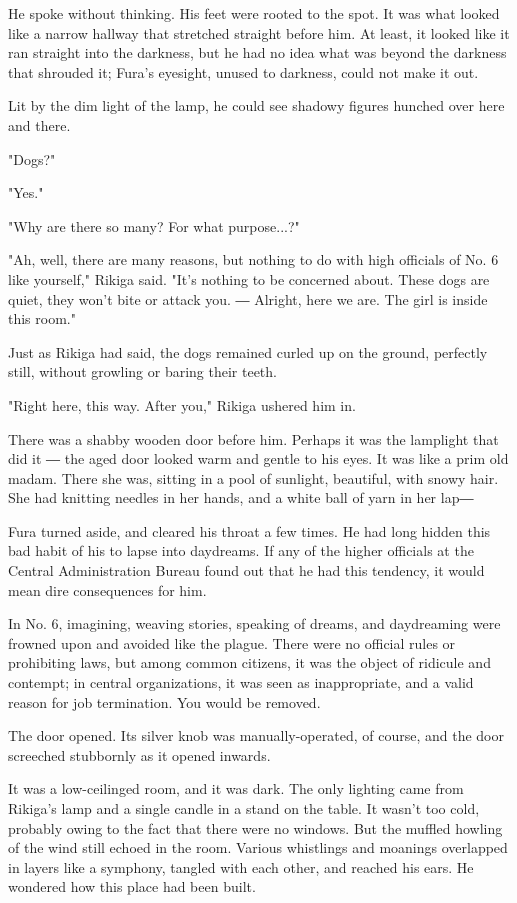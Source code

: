 He spoke without thinking. His feet were rooted to the spot. It was what
looked like a narrow hallway that stretched straight before him. At
least, it looked like it ran straight into the darkness, but he had no
idea what was beyond the darkness that shrouded it; Fura's eyesight,
unused to darkness, could not make it out.

Lit by the dim light of the lamp, he could see shadowy figures hunched
over here and there.

"Dogs?"

"Yes."

"Why are there so many? For what purpose...?"

"Ah, well, there are many reasons, but nothing to do with high officials
of No. 6 like yourself," Rikiga said. "It's nothing to be concerned
about. These dogs are quiet, they won't bite or attack you. ― Alright,
here we are. The girl is inside this room."

Just as Rikiga had said, the dogs remained curled up on the ground,
perfectly still, without growling or baring their teeth.

"Right here, this way. After you," Rikiga ushered him in.

There was a shabby wooden door before him. Perhaps it was the lamplight
that did it ― the aged door looked warm and gentle to his eyes. It was
like a prim old madam. There she was, sitting in a pool of sunlight,
beautiful, with snowy hair. She had knitting needles in her hands, and a
white ball of yarn in her lap―

Fura turned aside, and cleared his throat a few times. He had long
hidden this bad habit of his to lapse into daydreams. If any of the
higher officials at the Central Administration Bureau found out that he
had this tendency, it would mean dire consequences for him.

In No. 6, imagining, weaving stories, speaking of dreams, and
daydreaming were frowned upon and avoided like the plague. There were no
official rules or prohibiting laws, but among common citizens, it was
the object of ridicule and contempt; in central organizations, it was
seen as inappropriate, and a valid reason for job termination. You would
be removed.

The door opened. Its silver knob was manually-operated, of course, and
the door screeched stubbornly as it opened inwards.

It was a low-ceilinged room, and it was dark. The only lighting came
from Rikiga's lamp and a single candle in a stand on the table. It
wasn't too cold, probably owing to the fact that there were no windows.
But the muffled howling of the wind still echoed in the room. Various
whistlings and moanings overlapped in layers like a symphony, tangled
with each other, and reached his ears. He wondered how this place had
been built.

